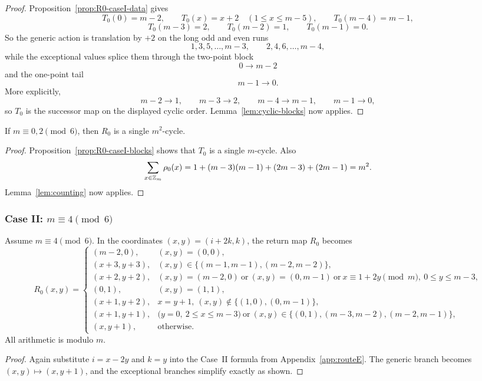 \begin{proof}
Proposition~\ref{prop:R0-caseI-data} gives
\[
T_0(0)=m-2,\qquad T_0(x)=x+2\quad (1\le x\le m-5),\qquad T_0(m-4)=m-1,
\]
\[
T_0(m-3)=2,\qquad T_0(m-2)=1,\qquad T_0(m-1)=0.
\]
So the generic action is translation by $+2$ on the long odd and even runs
\[
1,3,5,\dots,m-3,\qquad 2,4,6,\dots,m-4,
\]
while the exceptional values splice them through the two-point block
\[
0\to m-2
\]
and the one-point tail
\[
m-1\to 0.
\]
More explicitly,
\[
m-2\to 1,\qquad m-3\to 2,\qquad m-4\to m-1,\qquad m-1\to 0,
\]
so $T_0$ is the successor map on the displayed cyclic order.
Lemma~\ref{lem:cyclic-blocks} now applies.
\end{proof}

\begin{corollary}\label{cor:R0-caseI}
If $m\equiv 0,2\pmod 6$, then $R_0$ is a single $m^2$-cycle.
\end{corollary}

\begin{proof}
Proposition~\ref{prop:R0-caseI-blocks} shows that $T_0$ is a single $m$-cycle.
Also
\[
\sum_{x\in \mathbb Z_m}\rho_0(x)=1+(m-3)(m-1)+(2m-3)+(2m-1)=m^2.
\]
Lemma~\ref{lem:counting} now applies.
\end{proof}

\subsubsection{Case II: $m\equiv 4\pmod 6$}

\begin{lemma}\label{lem:R0-caseII-xy}
Assume $m\equiv 4\pmod 6$.
In the coordinates $(x,y)=(i+2k,k)$, the return map $R_0$ becomes
\[
R_0(x,y)=
\begin{cases}
(m-2,0),&(x,y)=(0,0),\\
(x+3,y+3),&(x,y)\in\{(m-1,m-1),(m-2,m-2)\},\\
(x+2,y+2),&(x,y)=(m-2,0)\ \text{or}\ (x,y)=(0,m-1)\ \text{or}\ x\equiv 1+2y\pmod m,\ 0\le y\le m-3,\\
(0,1),&(x,y)=(1,1),\\
(x+1,y+2),&x=y+1,\ (x,y)\notin\{(1,0),(0,m-1)\},\\
(x+1,y+1),&\bigl(y=0,\ 2\le x\le m-3\bigr)\ \text{or}\ (x,y)\in\{(0,1),(m-3,m-2),(m-2,m-1)\},\\
(x,y+1),&\text{otherwise}.
\end{cases}
\]
All arithmetic is modulo $m$.
\end{lemma}

\begin{proof}
Again substitute $i=x-2y$ and $k=y$ into the Case~II formula from Appendix~\ref{app:routeE}.
The generic branch becomes $(x,y)\mapsto(x,y+1)$, and the exceptional branches simplify exactly as shown.
\end{proof}

